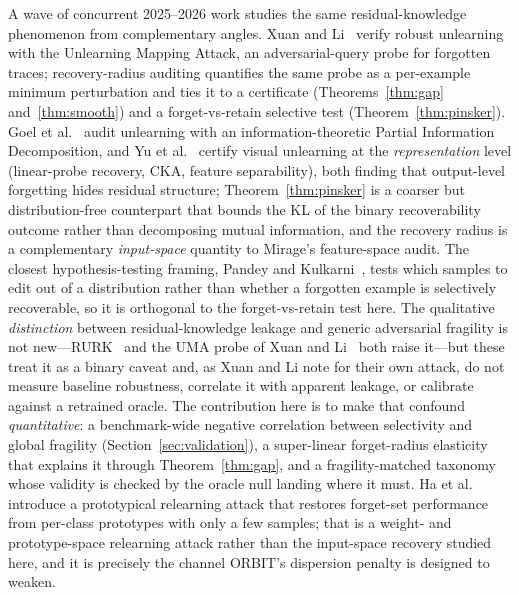 \documentclass{article}
\begin{document}
A wave of concurrent 2025--2026 work studies the same residual-knowledge phenomenon from complementary angles. Xuan and Li~\cite{xuan2025uma} verify robust unlearning with the Unlearning Mapping Attack, an adversarial-query probe for forgotten traces; recovery-radius auditing quantifies the same probe as a per-example minimum perturbation and ties it to a certificate (Theorems~\ref{thm:gap} and~\ref{thm:smooth}) and a forget-vs-retain selective test (Theorem~\ref{thm:pinsker}). Goel et al.~\cite{goel2026pid} audit unlearning with an information-theoretic Partial Information Decomposition, and Yu et al.~\cite{yu2026mirage} certify visual unlearning at the \emph{representation} level (linear-probe recovery, CKA, feature separability), both finding that output-level forgetting hides residual structure; Theorem~\ref{thm:pinsker} is a coarser but distribution-free counterpart that bounds the KL of the binary recoverability outcome rather than decomposing mutual information, and the recovery radius is a complementary \emph{input-space} quantity to Mirage's feature-space audit. The closest hypothesis-testing framing, Pandey and Kulkarni~\cite{pandey2026statistical}, tests which samples to edit out of a distribution rather than whether a forgotten example is selectively recoverable, so it is orthogonal to the forget-vs-retain test here. The qualitative \emph{distinction} between residual-knowledge leakage and generic adversarial fragility is not new---RURK~\cite{hsu2025rurk} and the UMA probe of Xuan and Li~\cite{xuan2025uma} both raise it---but these treat it as a binary caveat and, as Xuan and Li note for their own attack, do not measure baseline robustness, correlate it with apparent leakage, or calibrate against a retrained oracle. The contribution here is to make that confound \emph{quantitative}: a benchmark-wide negative correlation between selectivity and global fragility (Section~\ref{sec:validation}), a super-linear forget-radius elasticity that explains it through Theorem~\ref{thm:gap}, and a fragility-matched taxonomy whose validity is checked by the oracle null landing where it must. Ha et al.~\cite{ha2025prototypical} introduce a prototypical relearning attack that restores forget-set performance from per-class prototypes with only a few samples; that is a weight- and prototype-space relearning attack rather than the input-space recovery studied here, and it is precisely the channel ORBIT's dispersion penalty is designed to weaken.
\end{document}
